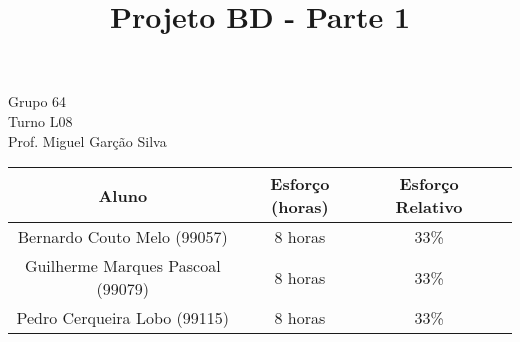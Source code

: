 \documentclass{article}
\title{{\Huge Projeto BD - Parte 1}}
\author{}
\date{}
\begin{document}
	\maketitle

	\begin{center}
		{\LARGE Grupo 64}\\
		\vspace{5mm}
		{\LARGE Turno L08}\\
		\vspace{5mm}
		{\LARGE Prof. Miguel Garção Silva}\\

		\vspace{6cm}

		\begin{tabular}{|c|c|c|c|} \hline
			\textbf{Aluno} & \textbf{Esforço (horas)} & \textbf{Esforço Relativo}\\ \hline
			Bernardo Couto Melo (99057)	& 8 horas & 33\%\\ \hline
			Guilherme Marques Pascoal (99079) & 8 horas & 33\%\\ \hline
			Pedro Cerqueira Lobo (99115) & 8 horas & 33\%\\ \hline
		\end{tabular}

	\end{center}
\end{document}
